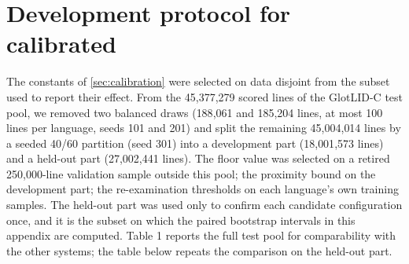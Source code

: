 \section{Development protocol for calibrated \unilid}\label{app:protocol}

The constants of \cref{sec:calibration} were selected on data disjoint from
the subset used to report their effect. From the 45{,}377{,}279 scored lines
of the GlotLID-C test pool, we removed two balanced draws (188{,}061 and
185{,}204 lines, at most 100 lines per language, seeds 101 and 201) and split
the remaining 45{,}004{,}014 lines by a seeded 40/60 partition (seed 301)
into a development part (18{,}001{,}573 lines) and a held-out part
(27{,}002{,}441 lines). The floor value was selected on a retired 250{,}000-line
validation sample outside this pool; the proximity bound on the development
part; the re-examination thresholds on each language's own training samples.
The held-out part was used only to confirm each candidate configuration once,
and it is the subset on which the paired bootstrap intervals in this appendix
are computed. Table 1 reports the full test pool for comparability with the
other systems; the table below repeats the comparison on the held-out part.
